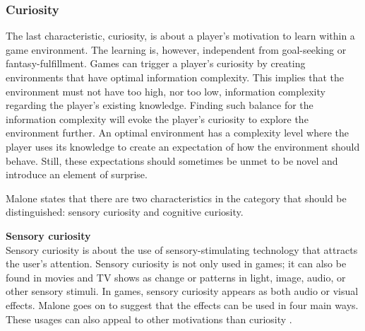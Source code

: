 \documentclass[../Main.tex]{subfiles}
\begin{document}
\subsubsection{Curiosity}
The last characteristic, curiosity, is about a player’s motivation to learn within a game environment. The learning is, however, independent from goal-seeking or fantasy-fulfillment. Games can trigger a player's curiosity by creating environments that have optimal information complexity. This implies that the environment must not have too high, nor too low, information complexity regarding the player’s existing knowledge. Finding such balance for the information complexity will evoke the player’s curiosity to explore the environment further. An optimal environment has a complexity level where the player uses its knowledge to create an expectation of how the environment should behave. Still, these expectations should sometimes be unmet to be novel and introduce an element of surprise.

Malone states that there are two characteristics in the category that should be distinguished: sensory curiosity and cognitive curiosity.

\textbf{Sensory curiosity} \\
Sensory curiosity is about the use of sensory-stimulating technology that attracts the user’s attention. Sensory curiosity is not only used in games; it can also be found in movies and TV shows as change or patterns in light, image, audio, or other sensory stimuli. In games, sensory curiosity appears as both audio or visual effects. Malone goes on to suggest that the effects can be used in four main ways. These usages can also appeal to other motivations than curiosity \citep{malone_what_1980}.
\end{document}
